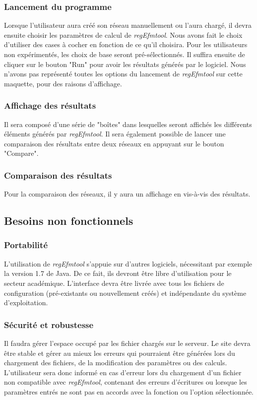 \subsubsection{Lancement du programme}
Lorsque l'utilisateur aura créé son réseau manuellement ou l'aura chargé, il devra ensuite choisir les paramètres de calcul de \textit{regEfmtool}. Nous avons fait le choix d'utiliser des cases à cocher en fonction de ce qu'il choisira. Pour les utilisateurs non expérimentés, les choix de base seront pré-sélectionnés. Il suffira ensuite de cliquer sur le bouton "Run" pour avoir les résultats générés par le logiciel. Nous n'avons pas représenté toutes les options du lancement de \textit{regEfmtool} sur cette maquette, pour des raisons d'affichage.

\subsubsection{Affichage des résultats}
Il sera composé d'une série de "boîtes" dans lesquelles seront affichés les différents éléments générés par \textit{regEfmtool}. Il sera également possible de lancer une comparaison des résultats entre deux réseaux en appuyant sur le bouton "Compare". 

\subsubsection{Comparaison des résultats}
Pour la comparaison des réseaux, il y aura un affichage en vis-à-vis des résultats. 

\subsection{Besoins non fonctionnels}

\subsubsection{Portabilité}
L'utilisation de \textit{regEfmtool} s'appuie sur d'autres logiciels, nécessitant par exemple la version 1.7 de Java. De ce fait, ils devront être libre d'utilisation pour le secteur académique. L'interface devra être livrée avec tous les fichiers de configuration (pré-existants ou nouvellement créés) et indépendante du système d'exploitation. 

\subsubsection{Sécurité et robustesse}
Il faudra gérer l'espace occupé par les fichier chargés sur le serveur. Le site devra être stable et gérer au mieux les erreurs qui pourraient être générées lors du chargement des fichiers, de la modification des paramètres ou des calculs. L'utilisateur sera donc informé en cas d'erreur lors du chargement d'un fichier non compatible avec \textit{regEfmtool}, contenant des erreurs d'écritures ou lorsque les paramètres entrés ne sont pas en accords avec la fonction ou l'option sélectionnée. 

